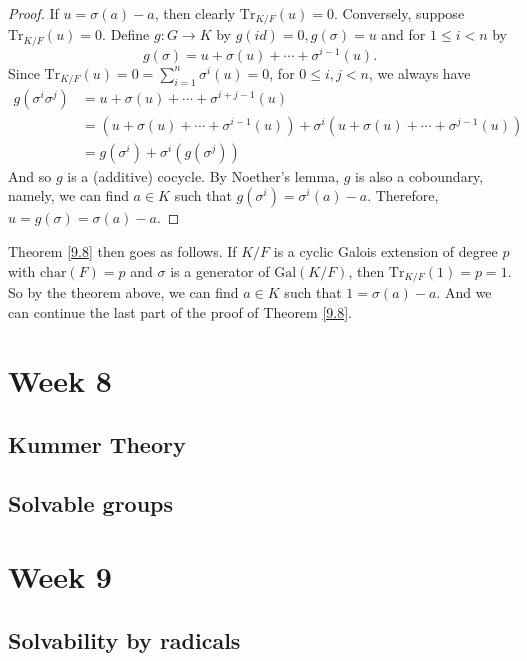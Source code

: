 \documentclass[12pt]{report}
\theoremstyle{definition}
\newcommand{\charr}{\text{char}}
\newcommand{\Gal}{\text{Gal}}
\newcommand{\Tr}{\text{Tr}}
\begin{document}
\begin{proof}
	If $u=\sigma(a)-a$, then clearly $\Tr_{K/F}(u)=0$. Conversely, suppose $\Tr_{K/F}(u)=0$. Define $g: G\to K$ by $g(id)=0,g(\sigma)=u$ and for $1\leq i<n $ by $$g(\sigma)=u+\sigma(u)+\cdots+\sigma^{i-1}(u).$$
	Since $\Tr_{K/F}(u)=0=\sum_{i=1}^n\sigma^i(u)=0$, for $0\leq i,j<n$, we always have
	\begin{align*}
		g(\sigma^i\sigma^j) & =u+\sigma(u)+\cdots+\sigma^{i+j-1}(u)                                               \\
		                    & = (u+\sigma(u)+\cdots+\sigma^{i-1}(u))+\sigma^i(u+\sigma(u)+\cdots+\sigma^{j-1}(u)) \\
		                    & =g(\sigma^i)+\sigma^i(g(\sigma^j))
	\end{align*}
	And so $g$ is a (additive) cocycle. By Noether's lemma, $g$ is also a coboundary, namely, we can find $a\in K$ such that $g(\sigma^i)=\sigma^i(a)-a$. Therefore, $u=g(\sigma)=\sigma(a)-a$.
\end{proof}

Theorem \ref{9.8} then goes as follows. If $K/F$ is a cyclic Galois extension of degree $p$ with $\charr(F)=p$ and $\sigma$ is a generator of $\Gal(K/F)$, then $\Tr_{K/F}(1)=p=1$. So by the theorem above, we can find $a\in K$ such that $1=\sigma(a)-a$. And we can continue the last part of the proof of Theorem \ref{9.8}.


\chapter*{Week 8}
\setcounter{chapter}{8}

\section{Kummer Theory}

\section{Solvable groups}

\chapter*{Week 9}
\setcounter{chapter}{9}

\section{Solvability by radicals}
\end{document}
